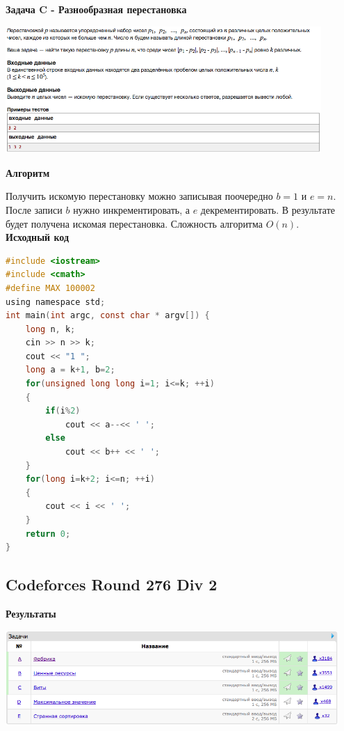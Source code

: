 \documentclass[a4paper,12pt]{article}
\begin{document}
\newpage
\textbf{{\large Задача C - Разнообразная перестановка}} \\
\begin{center}
\includegraphics[width=0.9\textwidth]{C_275/C_275_C.png}\\ [1cm]
\end{center}

\textbf{{\large Алгоритм}}

Получить искомую перестановку можно записывая поочередно $b = 1$ и $e = n$. После записи $b$ нужно инкрементировать, а $e$ декрементировать. В результате будет получена искомая перестановка. Сложность алгоритма $O(n)$.\\

\textbf{{\large Исходный код}} \\
\begin{lstlisting}[language=C]
#include <iostream>
#include <cmath>
#define MAX 100002
using namespace std;
int main(int argc, const char * argv[]) {
    long n, k;
    cin >> n >> k;
    cout << "1 ";
    long a = k+1, b=2;
    for(unsigned long long i=1; i<=k; ++i)
    {
        if(i%2)
            cout << a--<< ' ';
        else
            cout << b++ << ' ';
    }
    for(long i=k+2; i<=n; ++i)
    {
        cout << i << ' ';
    }
    return 0;
}
\end{lstlisting}


%
%

\newpage
\subsection{Codeforces Round 276 Div 2}

\textbf{{\large Результаты}} \\
\begin{center}
\includegraphics[width=0.95\textwidth]{C_276/A_C_276_result.png}\\ [1cm]
\end{center}
\end{document}
